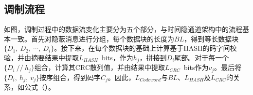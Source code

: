 \subsection{调制流程}
\label{chap:hash:designation:modulation}


如图，调制过程中的数据流变化主要分为五个部分，与时间隐通道架构中的流程基本一致。首先对隐蔽消息进行分组，每个数据块的长度为$BL$，得到等长数据块$\{D_{1},\ D_{2},\ \cdots ,\ D_{i}\}$。接下来，在每个数据块的基础上计算基于HASH的码字间校验，并由摘要结果中提取{$L_{HASH}$\ bits}，作为$h_{j}$，拼接到$D_{i}$尾部。对于每一个$\{D_{i}\ //\ h_{j}\}$组合，计算其CRC散列值，并由结果中提取{$L_{CRC}$\ bits}作为$v_{j}$。最后将$\{D_{i},\ h_{j},\ v_{j}\}$按序组合，得到码字$C_{j}$。因此，$L_{Codeword}$与$BL$、$L_{HASH}$及$L_{CRC}$的关系，如公式（）。


